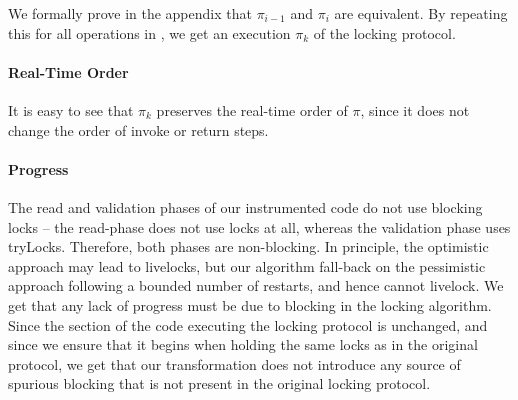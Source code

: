 We formally prove in the appendix that $\pi_{i-1}$ and $\pi_i$ are equivalent. 
By repeating this for all operations in \op, we get an execution $\pi_k$ of the locking protocol.

\paragraph{Real-Time Order}
It is easy to see that $\pi_k$ preserves the real-time order of $\pi$, since it does not change the order of invoke or return steps. 

\paragraph{Progress}
The read and validation phases of our instrumented code do not use blocking locks -- the read-phase does not use locks at all, whereas the 
validation phase uses tryLocks. Therefore, both phases are non-blocking. In principle, the optimistic approach may lead to livelocks, but 
our algorithm fall-back on the pessimistic approach following a bounded number of restarts, and hence cannot livelock. We get that any lack
of progress must be due to blocking in the locking algorithm. Since the section of the code executing the locking protocol is unchanged, and
since we ensure that it begins when holding the same locks as in the original protocol, we get that our transformation does not introduce any
source of spurious blocking that is not present in the original locking protocol. 


